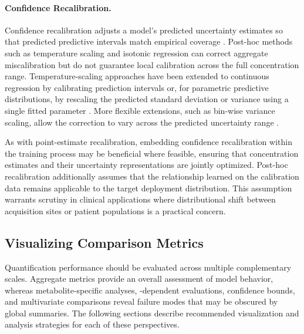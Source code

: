 \paragraph{Confidence Recalibration.}
Confidence recalibration adjusts a model's predicted uncertainty estimates so that predicted predictive intervals match empirical coverage \cite{Niculescu-Mizil2005, Kuleshov2018}. Post-hoc methods such as temperature scaling \cite{Guo2017} and isotonic regression \cite{Niculescu-Mizil2005} can correct aggregate miscalibration but do not guarantee local calibration across the full concentration range. Temperature-scaling approaches have been extended to continuous regression by calibrating prediction intervals \cite{Keren2018} or, for parametric predictive distributions, by rescaling the predicted standard deviation or variance using a single fitted parameter \cite{Levi2022}. More flexible extensions, such as bin-wise variance scaling, allow the correction to vary across the predicted uncertainty range \cite{Pernot2023}.

As with point-estimate recalibration, embedding confidence recalibration within the training process may be beneficial where feasible, ensuring that concentration estimates and their uncertainty representations are jointly optimized. Post-hoc recalibration additionally assumes that the relationship learned on the calibration data remains applicable to the target deployment distribution. This assumption warrants scrutiny in clinical \MRS applications where distributional shift between acquisition sites or patient populations is a practical concern.

\subsection{Visualizing Comparison Metrics}
Quantification performance should be evaluated across multiple complementary scales. Aggregate metrics provide an overall assessment of model behavior, whereas metabolite-specific analyses, \SNR-dependent evaluations, confidence bounds, and multivariate comparisons reveal failure modes that may be obscured by global summaries. The following sections describe recommended visualization and analysis strategies for each of these perspectives.

